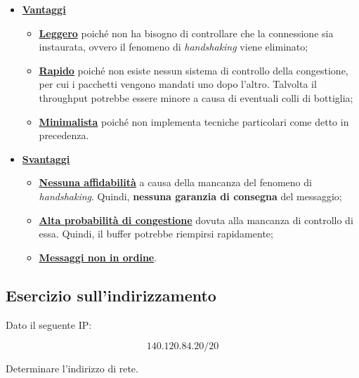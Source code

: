 \documentclass[a4paper]{article}
\begin{document}
	\begin{itemize}
		\item \textcolor{Green4}{\textbf{\underline{Vantaggi}}}
		\begin{itemize}
			\item \textbf{\underline{Leggero}} poiché non ha bisogno di controllare che la connessione sia instaurata, ovvero il fenomeno di \emph{handshaking} viene eliminato;
			
			\item \textbf{\underline{Rapido}} poiché non esiste nessun sistema di controllo della congestione, per cui i pacchetti vengono mandati uno dopo l'altro. Talvolta il throughput potrebbe essere minore a causa di eventuali colli di bottiglia;
			
			\item \textbf{\underline{Minimalista}} poiché non implementa tecniche particolari come detto in precedenza.
		\end{itemize}
		
		\item \textcolor{Red3}{\textbf{\underline{Svantaggi}}}
		\begin{itemize}
			\item \textbf{\underline{Nessuna affidabilità}} a causa della mancanza del fenomeno di \emph{handshaking}. Quindi, \textbf{nessuna garanzia di consegna} del messaggio;
			
			\item \textbf{\underline{Alta probabilità di congestione}} dovuta alla mancanza di controllo di essa. Quindi, il buffer potrebbe riempirsi rapidamente;
			
			\item \textbf{\underline{Messaggi non in ordine}}.
		\end{itemize}
	\end{itemize}

	\newpage
	
	\subsection{\textcolor{Red3}{Esercizio sull'indirizzamento}}
	
	Dato il seguente IP:
	
	\begin{equation*}
		140.120.84.20/20
	\end{equation*}
	
	\noindent
	Determinare l’indirizzo di rete.\newline
	
\end{document}
